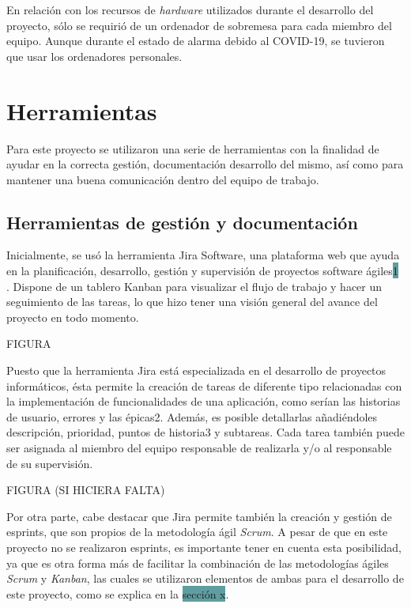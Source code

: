 \documentclass[pdftex,11pt,a4paper]{book}
\begin{document}
En relación con los recursos de \textit{hardware} utilizados durante el desarrollo del proyecto, sólo se requirió de un ordenador de sobremesa para cada miembro del equipo. Aunque durante el estado de alarma debido al COVID-19, se tuvieron que usar los ordenadores personales.

\section{Herramientas}

Para este proyecto se utilizaron una serie de herramientas con la finalidad de ayudar en la correcta gestión, documentación desarrollo del mismo, así como para mantener una buena comunicación dentro del equipo de trabajo.

\subsection{Herramientas de gestión y documentación} %
Inicialmente, se usó la herramienta Jira Software, una plataforma web que ayuda en la planificación, desarrollo, gestión y supervisión de proyectos software ágiles\colorbox{CadetBlue}{1} \cite{bib:atlassian}. Dispone de un tablero Kanban para visualizar el flujo de trabajo y hacer un seguimiento de las tareas, lo que hizo tener una visión general del avance del proyecto en todo momento. 

FIGURA

Puesto que la herramienta Jira está especializada en el desarrollo de proyectos informáticos, ésta permite la creación de tareas de diferente tipo relacionadas con la implementación de funcionalidades de una aplicación, como serían las historias de usuario, errores y las épicas2. Además, es posible detallarlas añadiéndoles descripción, prioridad, puntos de historia3 y subtareas. Cada tarea también puede ser asignada al miembro del equipo responsable de realizarla y/o al responsable de su supervisión.

FIGURA (SI HICIERA FALTA)

Por otra parte, cabe destacar que Jira permite también la creación y gestión de esprints, que son propios de la metodología ágil \textit{Scrum}. A pesar de que en este proyecto no se realizaron esprints, es importante tener en cuenta esta posibilidad, ya que es otra forma más de facilitar la combinación de las metodologías ágiles \textit{Scrum} y \textit{Kanban}, las cuales se utilizaron elementos de ambas para el desarrollo de este proyecto, como se explica en la \colorbox{CadetBlue}{sección x}.
\end{document}
